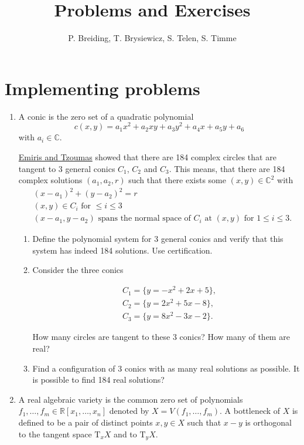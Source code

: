 \documentclass[11pt,reqno]{amsart}
\title{Problems and Exercises}
\author{P. Breiding, T. Brysiewicz, S. Telen, S. Timme}
\theoremstyle{definition}
\theoremstyle{remark}
\numberwithin{equation}{section}
\begin{document}
\maketitle
\tableofcontents

\section{Implementing problems}

\begin{enumerate}
\item A conic is the zero set of a quadratic polynomial
$$
c(x,y) = a_1 x^2 + a_2 x y + a_3 y^2 + a_4 x + a_5 y + a_6
$$
with $a_i \in \mathbb{C}$.

\href{http://www.win.tue.nl/EWCG2005/Proceedings/38.pdf}{Emiris and Tzoumas} showed that there are 184 complex circles that are tangent to 3 general conics $C_1$, $C_2$ and $C_3$. This means, that there are 184 complex solutions $(a_1,a_2,r)$ such that there exists some $(x,y)\in\mathbb{C}^2$ with
\begin{align*}
&(x-a_1)^2 + (y-a_2)^2 = r\\
&(x,y)\in C_i \text{ for } \leq i\leq 3\\
&(x-a_1, y-a_2) \text{ spans the normal space of $C_i$ at $(x,y)$ for $1\leq i\leq 3$.}
\end{align*}

\begin{enumerate}
\item Define the polynomial system for 3 general conics and verify that this system has indeed 184 solutions. Use certification.

\item
Consider the three conics

\begin{align*}
&C_1 = \{y=-x^2+2x+5\},\\
&C_2 = \{y = 2x^2+5x-8\},\\
&C_3 = \{y = 8x^2-3x-2\}.
\end{align*}

How many circles are tangent to these 3 conics? How many of them are real?

\item Find a configuration of 3 conics with as many real solutions as possible. It is possible to find 184 real solutions?

\end{enumerate}

\item A real algebraic variety is the common zero set of polynomials $f_1, \ldots, f_m \in \mathbb{R}[x_1,\ldots,x_n]$ denoted by $X=V(f_1,\ldots,f_m)$. A bottleneck of $X$ is defined to be a pair of distinct points $x, y \in X$ such that $x-y$ is orthogonal to the tangent space $\mathrm{T}_x X$ and to $\mathrm{T}_y X$.


\end{enumerate}
\end{document}
